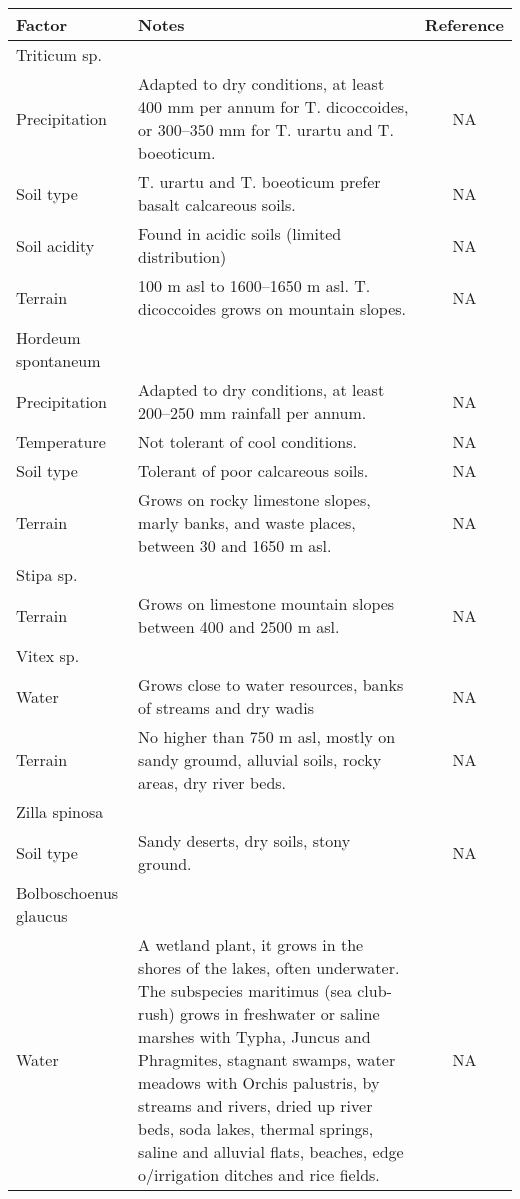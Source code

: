 \documentclass[]{article}
\begin{document}
\captionsetup[table]{labelformat=empty,skip=1pt}
\begin{longtable}{llc}
\toprule
Factor & Notes & Reference \\ 
\midrule
\multicolumn{1}{l}{Triticum sp.} \\ 
\midrule
Precipitation & Adapted to dry conditions, at least 400 mm per annum for T. dicoccoides, or 300–350 mm for T. urartu and T. boeoticum. & NA \\ 
Soil type & T. urartu and T. boeoticum prefer basalt calcareous soils. & NA \\ 
Soil acidity & Found in acidic soils (limited distribution) & NA \\ 
Terrain & 100 m asl to 1600–1650 m asl. T. dicoccoides grows on mountain slopes. & NA \\ 
\midrule
\multicolumn{1}{l}{Hordeum spontaneum} \\ 
\midrule
Precipitation & Adapted to dry conditions, at least 200–250 mm rainfall per annum. & NA \\ 
Temperature & Not tolerant of cool conditions. & NA \\ 
Soil type & Tolerant of poor calcareous soils. & NA \\ 
Terrain & Grows on rocky limestone slopes, marly banks, and waste places, between 30 and 1650 m asl. & NA \\ 
\midrule
\multicolumn{1}{l}{Stipa sp.} \\ 
\midrule
Terrain & Grows on limestone mountain slopes between 400 and 2500 m asl. & NA \\ 
\midrule
\multicolumn{1}{l}{Vitex sp.} \\ 
\midrule
Water & Grows close to water resources, banks of streams and dry wadis & NA \\ 
Terrain & No higher than 750 m asl, mostly on sandy groumd, alluvial soils, rocky areas, dry river beds. & NA \\ 
\midrule
\multicolumn{1}{l}{Zilla spinosa} \\ 
\midrule
Soil type & Sandy deserts, dry soils, stony ground. & NA \\ 
\midrule
\multicolumn{1}{l}{Bolboschoenus glaucus} \\ 
\midrule
Water & A wetland plant, it grows in the shores of the lakes, often underwater. The subspecies maritimus (sea club-rush) grows in freshwater or saline marshes with Typha, Juncus and Phragmites, stagnant swamps, water meadows with Orchis palustris, by streams and rivers, dried up river beds, soda lakes, thermal springs, saline and alluvial flats, beaches, edge o/irrigation ditches and rice fields. & NA \\ 

\end{longtable}
\end{document}
